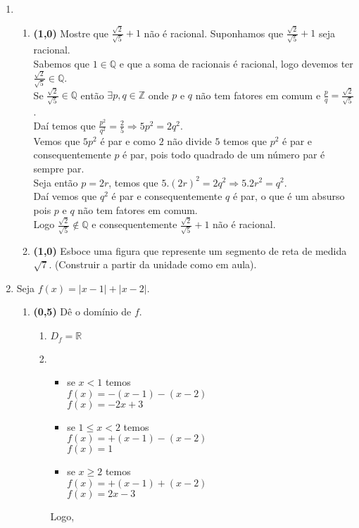 \documentclass[a4paper,12pt]{article}
\newcommand{\ds}{\displaystyle}
\begin{document}
\begin{enumerate}
\begin{enumerate}
\end{enumerate}	
\vspace{5mm}
\item	
	\begin{enumerate}
	\item {\bf (1,0)} Mostre que $\ds\frac{\sqrt{2}}{\sqrt{5}}+1$ não é racional. 
	\vspace{3mm}
	Suponhamos que $\frac{\sqrt{2}}{\sqrt{5}}+1$ seja racional.\\
 Sabemos que $1\in\mathbb{Q}$ e que a soma de racionais é racional, logo devemos ter $\frac{\sqrt{2}}{\sqrt{5}}\in\mathbb{Q}$.\\
 Se $\frac{\sqrt{2}}{\sqrt{5}}\in\mathbb{Q}$ então $\exists p,q\in\mathbb{Z}$ onde $p$ e $q$ não tem fatores em comum e $\frac{p}{q}=\frac{\sqrt{2}}{\sqrt{5}}$.\\
 Daí temos que $\frac{p^2}{q^2}=\frac{2}{5}\Rightarrow5p^2=2q^2$.\\
 Vemos que $5p^2$ é par e como $2$ não divide $5$ temos que $p^2$ é par e consequentemente $p$ é par, pois todo quadrado de um número par é sempre par.\\
 Seja então $p=2r$, temos que $5.(2r)^2=2q^2\Rightarrow5.2r^2=q^2$.\\
 Daí vemos que $q^2$ é par e consequentemente $q$ é par, o que é um absurso pois $p$ e $q$ não tem fatores em comum.\\
 Logo $\frac{\sqrt{2}}{\sqrt{5}}\not\in\mathbb{Q}$ e consequentemente $\frac{\sqrt{2}}{\sqrt{5}}+1$ não é racional.
	\item {\bf (1,0)} Esboce uma figura que represente um segmento de reta de medida $\sqrt{7}$. (Construir a partir da unidade como em aula). 
	\end{enumerate}
	
\vspace{5mm}

\item Seja $f(x)=|x-1|+|x-2|$.
\begin{enumerate}
\item {\bf (0,5)} Dê o domínio de $f$.
\begin{enumerate}
 \item $D_f=\mathbb{R}$

 \item 
  \begin{itemize}
  \item se $x<1$ temos\\
  $f(x)=-(x-1)-(x-2)$\\
  $f(x)=-2x+3$\\
  \item se $1\leq x<2$ temos\\
  $f(x)=+(x-1)-(x-2)$\\
  $f(x)=1$
  \item se $x\geq2$ temos\\
  $f(x)=+(x-1)+(x-2)$\\
  $f(x)=2x-3$\\
  \end{itemize}
 Logo,\\


\end{enumerate}
\end{enumerate}
\end{enumerate}
\end{document}
